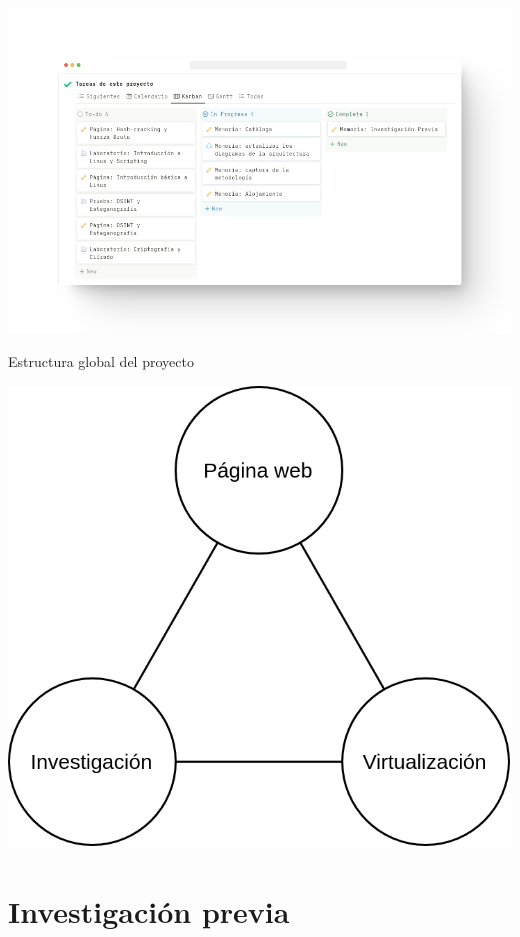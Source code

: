    \begin{frame}
        \centering

        \includegraphics[scale=0.3]{images/capturas/notion/kanban.png}
    \end{frame}

    \begin{frame}{Estructura global del proyecto}
        \centering

        \includegraphics[scale=0.2]{images/diagramas/estructura-global.png}
    \end{frame}


\section{Investigación previa}

